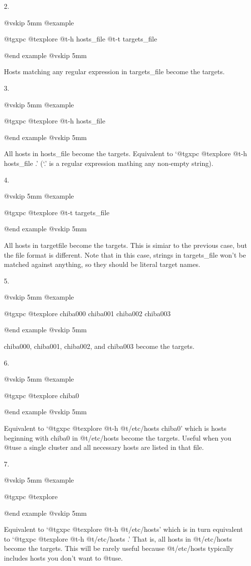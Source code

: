 2.

@vskip 5mm
@example

  @t{gxpc} @t{explore} @t{-h} hosts_file @t{-t} targets_file

@end example
@vskip 5mm

Hosts matching any regular expression in targets_file become
the targets.

3.

@vskip 5mm
@example

  @t{gxpc} @t{explore} @t{-h} hosts_file

@end example
@vskip 5mm

All hosts in hosts_file become the targets.  Equivalent to `@t{gxpc}
@t{explore} @t{-h} hosts_file .'  (`.' is a regular expression mathing
any non-empty string).

4.

@vskip 5mm
@example

  @t{gxpc} @t{explore} @t{-t} targets_file

@end example
@vskip 5mm

All hosts in targetfile become the targets. This is simiar to the
previous case, but the file format is different.  Note that in
this case, strings in targets_file won't be matched against
anything, so they should be literal target names.
     
5.

@vskip 5mm
@example

  @t{gxpc} @t{explore} chiba000 chiba001 chiba002 chiba003

@end example
@vskip 5mm

chiba000, chiba001, chiba002, and chiba003 become the targets.

6.

@vskip 5mm
@example

  @t{gxpc} @t{explore} chiba0

@end example
@vskip 5mm

Equivalent to `@t{gxpc} @t{explore} @t{-h} @t{/etc/hosts} chiba0' which is hosts
beginning with chiba0 in @t{/etc/hosts} become the targets. Useful
when you @t{use} a single cluster and all necessary hosts are listed
in that file.
     
7.

@vskip 5mm
@example

  @t{gxpc} @t{explore}

@end example
@vskip 5mm

Equivalent to `@t{gxpc} @t{explore} @t{-h} @t{/etc/hosts}' which is in turn
equivalent to `@t{gxpc} @t{explore} @t{-h} @t{/etc/hosts} .'  That is, all hosts
in @t{/etc/hosts} become the targets.  This will be rarely useful
because @t{/etc/hosts} typically includes hosts you don't want to
@t{use}.

